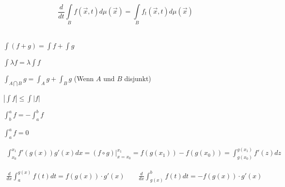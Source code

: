\documentclass[a4paper]{article}
\begin{document}
	\begin{fsatz}
			$$\frac{d}{dt}\int\limits_B f(\vec{x},t)d\mu(\vec{x})=\int\limits_B f_t(\vec{x},t)d\mu(\vec{x})$$\\[-5.5mm]
		\end{fsatz}
	
	\begin{fregeln}
		\begin{multicols}{2}
		\begin{itemize_compact}
				\item $\int{ (f+g) } = \int f + \int g$
				\item $\int \lambda f = \lambda \int f$
				\item $\int_{A \bigcap B} g = \int_{A} g + \int_{B} g$ (Wenn $A$ und $B$ disjunkt)
		\end{itemize_compact}
		\begin{itemize_compact}
				\item $|\int f| \le \int |f|$
				\item $\int_b^a f = - \int_a^b f$
				\item $\int_a^a f = 0$
		\end{itemize_compact}
		\end{multicols}
		\vspace{-3mm}
	\end{fregeln}
	
	\begin{fregeln}[Substitutionsregel]
		\begin{align*}
			\int_{x_0}^{x_1}f'(g(x))g'(x) dx = (f \circ g)|_{x=x_0}^{x_1} = f(g(x_1))-f(g(x_0)) = \int_{g(x_0)}^{g(x_1)}f'(z) dz
		\end{align*}
		\vspace{-3mm}
	\end{fregeln}

	\begin{fmerke}
		\begin{align*}
			\frac{d}{dx}\int^{g(x)}_a f(t)dt   =f(g(x))\cdot g'(x) \qquad
			\frac{d}{dx}\int^{b}_{g(x)} f(t)dt =-f(g(x))\cdot g'(x)
		\end{align*}
	\end{fmerke}
\end{document}
